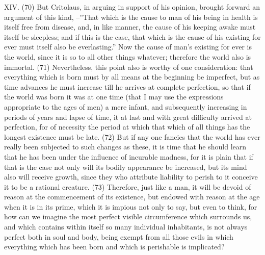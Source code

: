 XIV. (70) But Critolaus, in arguing in support of his opinion, brought forward an argument of this
kind, --''That which is the cause to man of his being in health is itself free from disease, and, in like
manner, the cause of his keeping awake must itself be sleepless; and if this is the case, that which
is the cause of his existing for ever must itself also be everlasting.'' Now the cause of man's
existing for ever is the world, since it is so to all other things whatever; therefore the world also is
immortal. (71) Nevertheless, this point also is worthy of one consideration: that everything which is
born must by all means at the beginning be imperfect, but as time advances he must increase till he
arrives at complete perfection, so that if the world was born it was at one time (that I may use the
expressions appropriate to the ages of men) a mere infant, and subsequently increasing in periods
of years and lapse of time, it at last and with great difficulty arrived at perfection, for of necessity
the period at which that which of all things has the longest existence must be late. (72) But if any
one fancies that the world has ever really been subjected to such changes as these, it is time that
he should learn that he has been under the influence of incurable madness, for it is plain that if that
is the case not only will its bodily appearance be increased, but its mind also will receive growth,
since they who attribute liability to perish to it conceive it to be a rational creature. (73) Therefore,
just like a man, it will be devoid of reason at the commencement of its existence, but endowed with
reason at the age when it is in its prime, which it is impious not only to say, but even to think, for
how can we imagine the most perfect visible circumference which surrounds us, and which
contains within itself so many individual inhabitants, is not always perfect both in soul and body,
being exempt from all those evils in which everything which has been born and which is perishable
is implicated?

